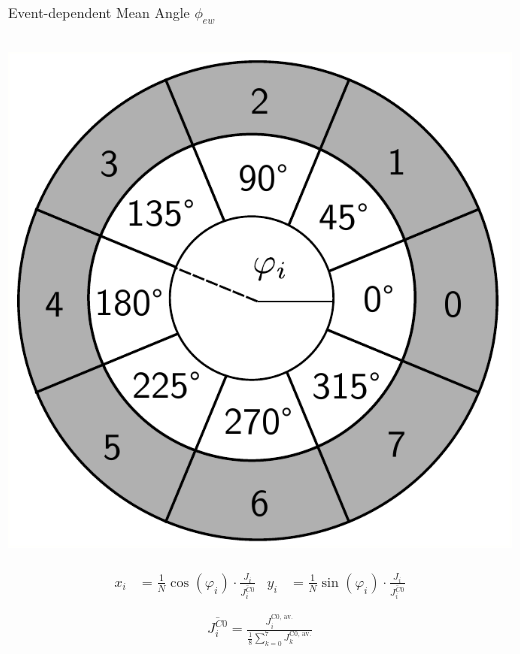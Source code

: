 \documentclass[aspectratio=169]{beamer}
\begin{document}
	\begin{frame}{Event-dependent Mean Angle $\phi_{ew}$}
		\begin{columns}
			
		
			\begin{column}{.5\textwidth}
				\centering
				\includegraphics[width=.45\textwidth]{pictures/phi_channel.pdf}
				
				
				\begin{gather}
					\begin{align*}
						x_{i}& = \frac{1}{N} \cos(\varphi_i) \cdot \frac{{J_i}}{ \overline{J_i^{C0}}} 
						& y_{i} &=\frac{1}{N} \sin(\varphi_i) \cdot \frac{{J_i}}{ \overline{J_i^{C0}}} \\					 
					\end{align*}
				\end{gather}
			\vspace{-1cm}
			\begin{align*}
				\overline{J_i^{C0}} = \frac{J_i^{\text{C0, av.}}}{\frac{1}{8}\sum_{k=0}^{7} J_k^{\text{C0, av.}}}
			\end{align*}	
				
				
			\end{column}
		

\end{columns}
\end{frame}
\end{document}
